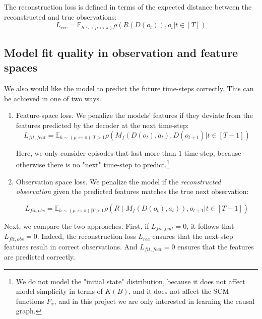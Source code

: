 \documentclass[a4paper,11pt,oneside]{report}
\begin{document}
The reconstruction loss is defined in terms of the expected distance between the reconstructed and true observations:
\begin{equation}
\label{eq:reconstruction_loss}
L_{rec}=\mathbb E_{h\sim (\mu\leftrightarrow \pi)}\rho(R(D(o_t)), o_t|t\in [T])
\end{equation}

\subsection{Model fit quality in observation and feature spaces}
We also would like the model to predict the future time-steps correctly. This can be achieved in one of two ways.

\begin{enumerate}
    \item Feature-space loss. We penalize the models' features if they deviate from the features predicted by the decoder at the next time-step:
    \begin{equation}
    \label{eq:loss_fit_feature}
    L_{fit,feat}=\mathbb E_{h\sim (\mu\leftrightarrow\pi)|T>1}\rho(M_f(D(o_t), a_t), D(o_{t+1})|t\in [T-1])
    \end{equation}

    Here, we only consider episodes that last more than $1$ time-step, because otherwise there is no "next" time-step to predict.\footnote{We do not model the "initial state" distribution, because it does not affect model simplicity in terms of $K(B)$, and it does not affect the SCM functions $F_x$, and in this project we are only interested in learning the causal graph.}

    \item Observation space loss. We penalize the model if the {\em reconstructed observation} given the predicted features matches the true next observation:

    \begin{equation}
    \label{eq:loss_fit_obs_space}
    L_{fit,obs}=\mathbb E_{h\sim (\mu\leftrightarrow \pi)|T>1}\rho(R(M_f(D(o_t), a_t)), o_{t+1}|t\in [T-1])
    \end{equation}
\end{enumerate}

Next, we compare the two approaches. First, if $L_{fit, feat}=0$, it follows that $L_{fit, obs}=0$. Indeed, the reconstruction loss $L_{rec}$ ensures that the next-step features result in correct observations. And $L_{fit, feat}=0$ ensures that the features are predicted correctly.
\end{document}
